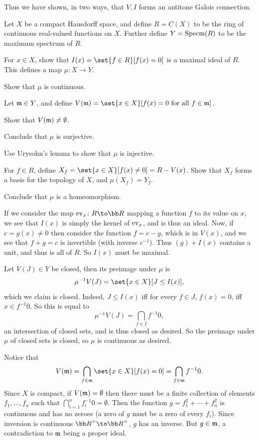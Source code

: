 Thus we have shown, in two ways, that $V,I$ forms an antitone Galois connection.

\bprob

    Let $X$ be a compact Hausdorff space, and define $R=C(X)$ to be the ring of continuous real-valued functions on $X$.
    Further define $Y={\rm Specm}(R)$ to be the maximum spectrum of $R$.
    \benum
        \item For $x\in X$, show that $I(x)=\set{f\in R}[f(x)=0]$ is a maximal ideal of $R$.
        This defines a map $\mu\colon X\to Y$.
        \item Show that $\mu$ is continuous.
        \item Let ${{\frak m}}\in Y$, and define $V(\m)=\set{x\in X}[f(x)=0\hbox{ for all $f\in\m$}]$.
        \benum
            \item Show that $V({{\frak m}})\neq\emptyset$.
            \item Conclude that $\mu$ is surjective.
        \eenum
        \item Use Urysohn's lemma to show that $\mu$ is injective.
        \item For $f\in R$, define $X_f=\set{x\in X}[f(x)\neq0]=R-V(x)$.
        Show that $X_f$ forms a basis for the topology of $X$, and $\mu(X_f)=Y_f$.
        \item Conclude that $\mu$ is a homeomorphism.
    \eenum

\eprob

\benum
    \item If we consider the map $\ev_x\colon R\to\bR$ mapping a function $f$ to its value on $x$, we see that $I(x)$ is simply the kernel
    of ${\rm ev}_x$, and is thus an ideal.
    Now, if $c=g(x)\neq0$ then consider the function $f=c-g$, which is in $V(x)$, and we see that $f+g=c$ is invertible (with inverse $c^{-1}$).
    Thus $(g)+I(x)$ contains a unit, and thus is all of $R$.
    So $I(x)$ must be maximal.

    \item Let $V(J)\in Y$ be closed, then its preimage under $\mu$ is
    $$ \mu^{-1}V(J) = \set{x\in X}[J\leq I(x)] , $$
    which we claim is closed.
    Indeed, $J\leq I(x)$ iff for every $f\in J$, $f(x)=0$, iff $x\in f^{-1}0$.
    So this is equal to
    $$ \mu^{-1}V(J) = \bigcap_{f\in I}f^{-1}0 , $$
    an intersection of closed sets, and is thus closed as desired.
    So the preimage under $\mu$ of closed sets is closed, so $\mu$ is continuous as desired.

    \item
    \benum
        \item Notice that
        $$ V(\m) = \bigcap_{f\in\m}\set{x\in X}[f(x)=0] = \bigcap_{f\in\m}f^{-1}0 . $$
        Since $X$ is compact, if $V({{\frak m}})=\emptyset$ then there must be a finite collection of elements $f_1,\dots,f_n$ such that $\bigcap_{i=1}^nf_i^{-1}0=\emptyset$.
        Then the function $g=f_1^2+\cdots+f_n^2$ is continuous and has no zeroes (a zero of $g$ must be a zero of every $f_i$).
        Since inversion is continuous $\bR^\times\to\bR^\times$, $g$ has an inverse.
        But $g\in{{\frak m}}$, a contradiction to ${{\frak m}}$ being a proper ideal.

